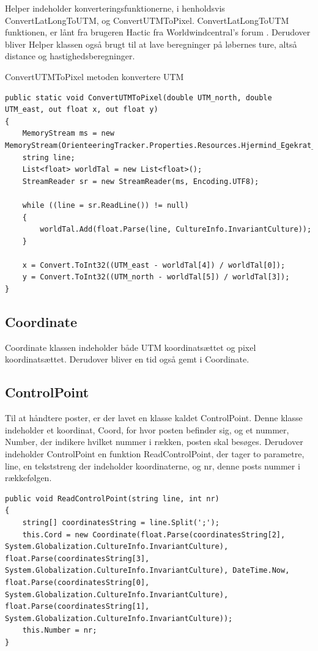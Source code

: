 Helper indeholder konverteringsfunktionerne, i henholdsvis ConvertLatLongToUTM, og ConvertUTMToPixel. ConvertLatLongToUTM funktionen, er lånt fra brugeren Hactic fra Worldwindcentral's forum \citep{UTM}.
Derudover bliver Helper klassen også brugt til at lave beregninger på løbernes ture, altså distance og hastighedsberegninger.
 
ConvertUTMToPixel metoden konvertere UTM

\begin{lstlisting}
public static void ConvertUTMToPixel(double UTM_north, double UTM_east, out float x, out float y)
{
    MemoryStream ms = new MemoryStream(OrienteeringTracker.Properties.Resources.Hjermind_Egekrat_ref_ref1);
    string line;
    List<float> worldTal = new List<float>();
    StreamReader sr = new StreamReader(ms, Encoding.UTF8);

    while ((line = sr.ReadLine()) != null)
    {
        worldTal.Add(float.Parse(line, CultureInfo.InvariantCulture));
    }

    x = Convert.ToInt32((UTM_east - worldTal[4]) / worldTal[0]);
    y = Convert.ToInt32((UTM_north - worldTal[5]) / worldTal[3]);
}
\end{lstlisting}

\subsection{Coordinate}
Coordinate klassen indeholder både UTM koordinatsættet og pixel koordinatsættet. Derudover bliver en tid også gemt i Coordinate.

\subsection{ControlPoint}
Til at håndtere poster, er der lavet en klasse kaldet ControlPoint. Denne klasse indeholder et koordinat, Coord, for hvor posten befinder sig, og et nummer, Number, der indikere hvilket nummer i rækken, posten skal besøges. 
Derudover indeholder ControlPoint en funktion ReadControlPoint, der tager to parametre, line, en tekststreng der indeholder koordinaterne, og nr, denne posts nummer i rækkefølgen. 

\begin{lstlisting}
public void ReadControlPoint(string line, int nr)
{
    string[] coordinatesString = line.Split(';');
    this.Cord = new Coordinate(float.Parse(coordinatesString[2], System.Globalization.CultureInfo.InvariantCulture), float.Parse(coordinatesString[3], System.Globalization.CultureInfo.InvariantCulture), DateTime.Now, float.Parse(coordinatesString[0], System.Globalization.CultureInfo.InvariantCulture), float.Parse(coordinatesString[1], System.Globalization.CultureInfo.InvariantCulture));
    this.Number = nr;
}
\end{lstlisting}

